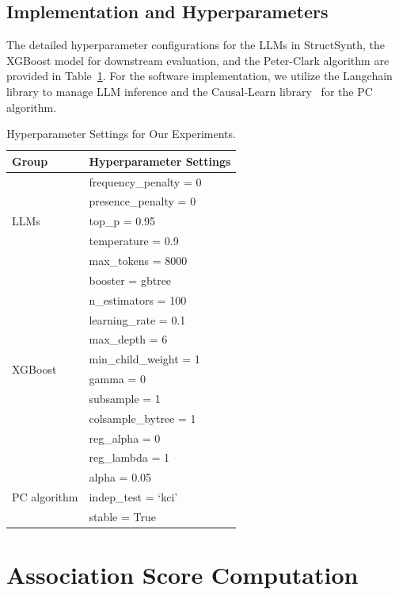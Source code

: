 \subsection{Implementation and Hyperparameters}
\label{app:hyperparameter}

The detailed hyperparameter configurations for the LLMs in \textsf{StructSynth}, the XGBoost model for downstream evaluation, and the Peter-Clark algorithm are provided in Table~\ref{tab:hyperparameters}. For the software implementation, we utilize the Langchain library to manage LLM inference and the Causal-Learn library~\cite{zheng2024causal} for the PC algorithm. 


\begin{table}[htbp]
\centering
\caption{Hyperparameter Settings for Our Experiments.}
\label{tab:hyperparameters}
\begin{tabular}{ll}
    \toprule
    \textbf{Group} & \textbf{Hyperparameter Settings} \\
    \midrule
    \multirow{5}{*}{LLMs} & frequency\_penalty = 0 \\
    & presence\_penalty = 0 \\
    & top\_p = 0.95 \\
    & temperature = 0.9 \\
    & max\_tokens = 8000 \\
    \midrule
    \multirow{10}{*}{XGBoost} & booster = gbtree \\
    & n\_estimators = 100 \\
    & learning\_rate = 0.1 \\
    & max\_depth = 6 \\
    & min\_child\_weight = 1 \\
    & gamma = 0 \\
    & subsample = 1 \\
    & colsample\_bytree = 1 \\
    & reg\_alpha = 0 \\
    & reg\_lambda = 1 \\
    \midrule
    \multirow{3}{*}{PC algorithm} & alpha = 0.05 \\
    & indep\_test = `kci' \\
    & stable = True \\
    \bottomrule
\end{tabular}
\end{table}

\section{Association Score Computation}
\label{app:association_scores}

